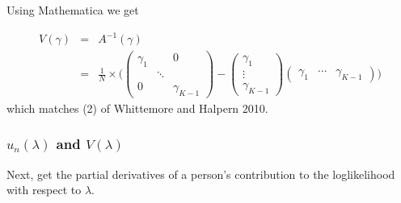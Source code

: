\documentclass[11pt]{article}
\begin{document}
Using Mathematica we get

\begin{eqnarray}
  \label{eq:one}
V(\gamma) & = & 
                              A^{-1}(\gamma)  \\ 
                  & = & \frac{1}{N} \times \Biggl(
                             \left( 
                             \begin{array} {ccc}
                                      \gamma_1 & & 0\\
                                       & \ddots & \\
                                      0 & & \gamma_{K-1}
                               \end{array} \right)
                              - \left( 
                             \begin{array} {c} 
                                    \gamma_1 \\ 
                                    \vdots \\ 
                                    \gamma_{K-1} 
                             \end{array}
                             \right) \left(
                             \begin{array} {ccc} 
                                     \gamma_1 & \cdots & \gamma_{K-1} 
                              \end{array}
                            \right)
                            \Biggr)
\end{eqnarray}
which matches (2) of Whittemore and Halpern 2010.


\subsubsection{$u_n(\lambda)$ and $V(\lambda)$}

Next, get the partial derivatives of a person's contribution to the
loglikelihood with respect to $\lambda$.
\end{document}
